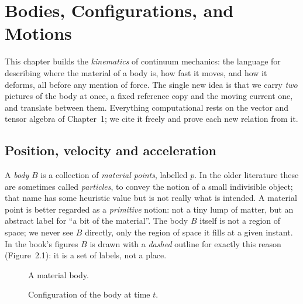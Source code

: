 



\chapter{Bodies, Configurations, and Motions}

This chapter builds the \emph{kinematics} of continuum mechanics: the
language for describing where the material of a body is, how fast it moves,
and how it deforms, all before any mention of force. The single new idea is
that we carry \emph{two} pictures of the body at once, a fixed reference
copy and the moving current one, and translate between them. Everything
computational rests on the vector and tensor algebra of Chapter~1; we cite
it freely and prove each new relation from it.

\section{Position, velocity and acceleration}\label{sec:pva}

A \emph{body} $B$ is a collection of \emph{material points}, labelled $p$.
In the older literature these are sometimes called \emph{particles}, to
convey the notion of a small indivisible object; that name has some
heuristic value but is not really what is intended. A material point is
better regarded as a \emph{primitive} notion: not a tiny lump of matter, but
an abstract label for ``a bit of the material''. The body $B$ itself is not a
region of space; we never see $B$ directly, only the region of space it
fills at a given instant. In the book's figures $B$ is drawn with a
\emph{dashed} outline for exactly this reason (Figure~2.1): it is a set of
labels, not a place.

\begin{figure}[htbp]\centering
{}
\caption{A material body.}\label{fig:2.1}
\end{figure}

\begin{figure}[htbp]\centering
{}
\caption{Configuration of the body at time $t$.}\label{fig:2.2}
\end{figure}

